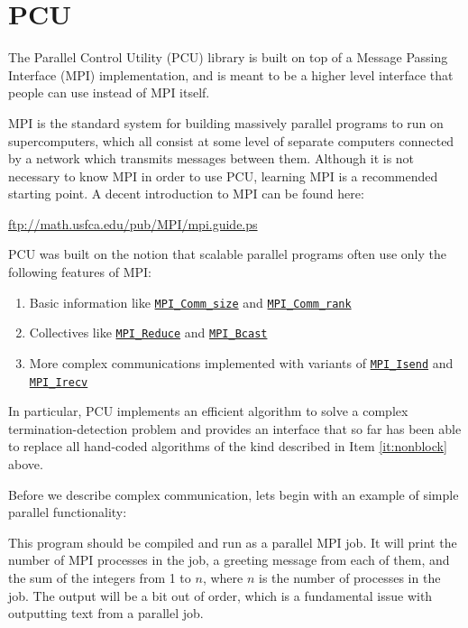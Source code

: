 \documentclass{article}
\begin{document}
\section{PCU}
\label{sec:pcu}

The Parallel Control Utility (PCU) library is built
on top of a Message Passing Interface (MPI) implementation,
and is meant to be a higher level interface that people
can use instead of MPI itself.

MPI is the standard system for building massively parallel
programs to run on supercomputers, which all consist
at some level of separate computers connected by a
network which transmits messages between them.
Although it is not necessary to know MPI in order to use
PCU, learning MPI is a recommended starting point.
A decent introduction to MPI can be found here:

\url{ftp://math.usfca.edu/pub/MPI/mpi.guide.ps}

PCU was built on the notion that scalable parallel
programs often use only the following features of MPI:

\begin{enumerate}
\item Basic information like
\href{http://www.mpich.org/static/docs/v3.1/www3/MPI_Comm_size.html}{\texttt{MPI\_Comm\_size}}
and
\href{http://www.mpich.org/static/docs/v3.1/www3/MPI_Comm_rank.html}{\texttt{MPI\_Comm\_rank}}
\item Collectives like
\href{http://www.mpich.org/static/docs/v3.1/www3/MPI_Reduce.html}{\texttt{MPI\_Reduce}}
and
\href{http://www.mpich.org/static/docs/v3.1/www3/MPI_Bcast.html}{\texttt{MPI\_Bcast}}
\item \label{it:nonblock} More complex communications implemented with variants of
\href{http://www.mpich.org/static/docs/v3.1/www3/MPI_Isend.html}{\texttt{MPI\_Isend}}
and
\href{http://www.mpich.org/static/docs/v3.1/www3/MPI_Irecv.html}{\texttt{MPI\_Irecv}}
\end{enumerate}

In particular, PCU implements an efficient algorithm to solve a complex
termination-detection problem and provides an interface that
so far has been able to replace all hand-coded algorithms
of the kind described in Item \ref{it:nonblock} above.

Before we describe complex communication, lets begin with an example
of simple parallel functionality:



This program should be compiled and run as a parallel MPI job.
It will print the number of MPI processes in the job, a greeting
message from each of them, and the sum of the integers from 1 to $n$,
where $n$ is the number of processes in the job. 
The output will be a bit out of order, which is a fundamental issue
with outputting text from a parallel job.
\end{document}
